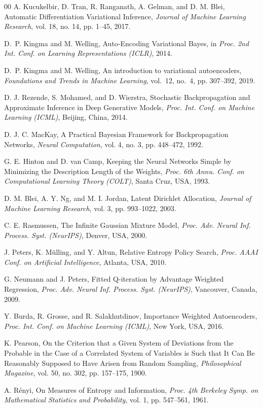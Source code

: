 \documentclass[final]{ws-ijseke}
\begin{document}
\begin{thebibliography}{00}
A. Kucukelbir, D. Tran, R. Ranganath, A. Gelman, and D. M. Blei,
Automatic Differentiation Variational Inference,
{\it Journal of Machine Learning Research}, vol. 18, no. 14, pp. 1–45, 2017.

D.~P. Kingma and M. Welling,
Auto‑Encoding Variational Bayes, in
{\it Proc. 2nd Int. Conf. on Learning Representations (ICLR)}, 2014.

D.~P. Kingma and M. Welling,
An introduction to variational autoencoders,
{\it Foundations and Trends in Machine Learning}, vol.~12, no.~4, pp. 307--392, 2019.

D. J. Rezende, S. Mohamed, and D. Wierstra,
Stochastic Backpropagation and Approximate Inference in Deep Generative Models,
{\it Proc. Int. Conf. on Machine Learning (ICML)}, Beijing, China, 2014.

D. J. C. MacKay,
A Practical Bayesian Framework for Backpropagation Networks,
{\it Neural Computation}, vol. 4, no. 3, pp. 448–472, 1992.

G. E. Hinton and D. van Camp,
Keeping the Neural Networks Simple by Minimizing the Description Length of the Weights,
{\it Proc. 6th Annu. Conf. on Computational Learning Theory (COLT)}, Santa Cruz, USA, 1993.

D. M. Blei, A. Y. Ng, and M. I. Jordan,
Latent Dirichlet Allocation,
{\it Journal of Machine Learning Research}, vol. 3, pp. 993–1022, 2003.

C. E. Rasmussen,
The Infinite Gaussian Mixture Model,
{\it Proc. Adv. Neural Inf. Process. Syst. (NeurIPS)}, Denver, USA, 2000.

J. Peters, K. Mülling, and Y. Altun,
Relative Entropy Policy Search,
{\it Proc. AAAI Conf. on Artificial Intelligence}, Atlanta, USA, 2010.

G. Neumann and J. Peters,
Fitted Q-iteration by Advantage Weighted Regression,
{\it Proc. Adv. Neural Inf. Process. Syst. (NeurIPS)}, Vancouver, Canada, 2009.

Y. Burda, R. Grosse, and R. Salakhutdinov,
Importance Weighted Autoencoders,
{\it Proc. Int. Conf. on Machine Learning (ICML)}, New York, USA, 2016.

K. Pearson,
On the Criterion that a Given System of Deviations from the Probable in the Case of a Correlated System of Variables is Such that It Can Be Reasonably Supposed to Have Arisen from Random Sampling,
{\it Philosophical Magazine}, vol. 50, no. 302, pp. 157–175, 1900.


A. Rényi,
On Measures of Entropy and Information,
{\it Proc. 4th Berkeley Symp. on Mathematical Statistics and Probability}, vol. 1, pp. 547–561, 1961.

\end{thebibliography}
\end{document}
